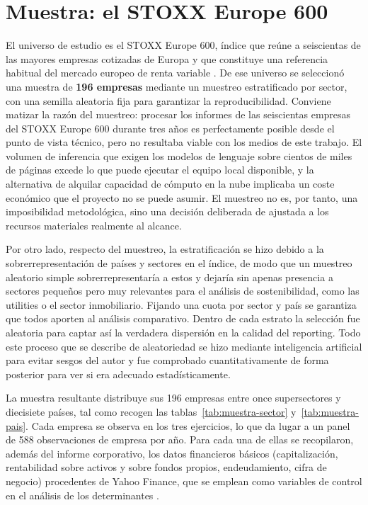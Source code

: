 \section{Muestra: el STOXX Europe 600}
\label{sec:muestra}

El universo de estudio es el STOXX Europe 600, índice que reúne a seiscientas de las mayores
empresas cotizadas de Europa y que constituye una referencia habitual del mercado europeo de
renta variable \parencite{stoxx2024}. De ese universo se seleccionó una muestra de
\textbf{196 empresas} mediante un muestreo estratificado por sector, con una semilla aleatoria
fija para garantizar la reproducibilidad. Conviene matizar la razón del muestreo: procesar los
informes de las seiscientas empresas del STOXX Europe 600 durante tres años es perfectamente
posible desde el punto de vista técnico, pero no resultaba viable con los medios de este
trabajo. El volumen de inferencia que exigen los modelos de lenguaje sobre cientos de miles de
páginas excede lo que puede ejecutar el equipo local disponible, y la alternativa de alquilar
capacidad de cómputo en la nube implicaba un coste económico que el proyecto no se puede asumir. 
El muestreo no es, por tanto, una imposibilidad
metodológica, sino una decisión deliberada de ajustada a los recursos materiales
realmente al alcance. 

Por otro lado, respecto del muestreo, la estratificación se hizo debido a la 
sobrerrepresentación de países y sectores en el índice, de modo que un muestreo aleatorio
simple sobrerrepresentaría a estos y dejaría sin apenas presencia a sectores pequeños pero muy
relevantes para el análisis de sostenibilidad, como las utilities o el sector inmobiliario.
Fijando una cuota por sector y país se garantiza que todos aporten al análisis comparativo. Dentro de
cada estrato la selección fue aleatoria para captar así la verdadera dispersión en la calidad del reporting. Todo este proceso que
se describe de aleatoriedad se hizo mediante inteligencia artificial para evitar sesgos del autor y fue comprobado cuantitativamente
de forma posterior para ver si era adecuado estadísticamente.

La muestra resultante distribuye sus 196 empresas entre once supersectores y diecisiete países,
tal como recogen las tablas~\ref{tab:muestra-sector} y~\ref{tab:muestra-pais}. Cada empresa se
observa en los tres ejercicios, lo que da lugar a un panel de 588 observaciones de empresa por
año. Para cada una de ellas se recopilaron, además del informe corporativo, los datos
financieros básicos (capitalización, rentabilidad sobre activos y sobre fondos propios,
endeudamiento, cifra de negocio) procedentes de Yahoo Finance, que se emplean como variables de
control en el análisis de los determinantes \parencite{yfinance2024}.

